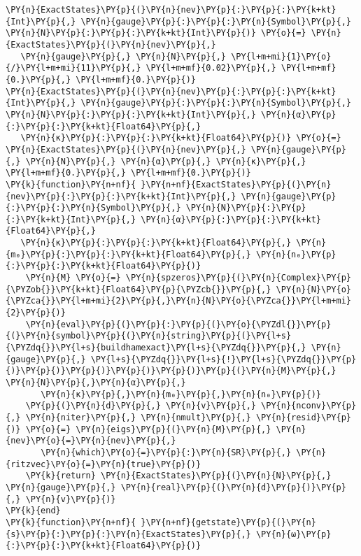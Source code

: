 \begin{Verbatim}[commandchars=\\\{\}]
\PY{n}{ExactStates}\PY{p}{(}\PY{n}{nev}\PY{p}{:}\PY{p}{:}\PY{k+kt}{Int}\PY{p}{,} \PY{n}{gauge}\PY{p}{:}\PY{p}{:}\PY{n}{Symbol}\PY{p}{,} \PY{n}{N}\PY{p}{:}\PY{p}{:}\PY{k+kt}{Int}\PY{p}{)} \PY{o}{=} \PY{n}{ExactStates}\PY{p}{(}\PY{n}{nev}\PY{p}{,}
   \PY{n}{gauge}\PY{p}{,} \PY{n}{N}\PY{p}{,} \PY{l+m+mi}{1}\PY{o}{/}\PY{l+m+mi}{11}\PY{p}{,} \PY{l+m+mf}{0.02}\PY{p}{,} \PY{l+m+mf}{0.}\PY{p}{,} \PY{l+m+mf}{0.}\PY{p}{)}
\PY{n}{ExactStates}\PY{p}{(}\PY{n}{nev}\PY{p}{:}\PY{p}{:}\PY{k+kt}{Int}\PY{p}{,} \PY{n}{gauge}\PY{p}{:}\PY{p}{:}\PY{n}{Symbol}\PY{p}{,} \PY{n}{N}\PY{p}{:}\PY{p}{:}\PY{k+kt}{Int}\PY{p}{,} \PY{n}{α}\PY{p}{:}\PY{p}{:}\PY{k+kt}{Float64}\PY{p}{,}
   \PY{n}{κ}\PY{p}{:}\PY{p}{:}\PY{k+kt}{Float64}\PY{p}{)} \PY{o}{=} \PY{n}{ExactStates}\PY{p}{(}\PY{n}{nev}\PY{p}{,} \PY{n}{gauge}\PY{p}{,} \PY{n}{N}\PY{p}{,} \PY{n}{α}\PY{p}{,} \PY{n}{κ}\PY{p}{,} \PY{l+m+mf}{0.}\PY{p}{,} \PY{l+m+mf}{0.}\PY{p}{)}
\PY{k}{function}\PY{n+nf}{ }\PY{n+nf}{ExactStates}\PY{p}{(}\PY{n}{nev}\PY{p}{:}\PY{p}{:}\PY{k+kt}{Int}\PY{p}{,} \PY{n}{gauge}\PY{p}{:}\PY{p}{:}\PY{n}{Symbol}\PY{p}{,} \PY{n}{N}\PY{p}{:}\PY{p}{:}\PY{k+kt}{Int}\PY{p}{,} \PY{n}{α}\PY{p}{:}\PY{p}{:}\PY{k+kt}{Float64}\PY{p}{,}
   \PY{n}{κ}\PY{p}{:}\PY{p}{:}\PY{k+kt}{Float64}\PY{p}{,} \PY{n}{m₀}\PY{p}{:}\PY{p}{:}\PY{k+kt}{Float64}\PY{p}{,} \PY{n}{n₀}\PY{p}{:}\PY{p}{:}\PY{k+kt}{Float64}\PY{p}{)}
    \PY{n}{M} \PY{o}{=} \PY{n}{spzeros}\PY{p}{(}\PY{n}{Complex}\PY{p}{\PYZob{}}\PY{k+kt}{Float64}\PY{p}{\PYZcb{}}\PY{p}{,} \PY{n}{N}\PY{o}{\PYZca{}}\PY{l+m+mi}{2}\PY{p}{,}\PY{n}{N}\PY{o}{\PYZca{}}\PY{l+m+mi}{2}\PY{p}{)}
    \PY{n}{eval}\PY{p}{(}\PY{p}{:}\PY{p}{(}\PY{o}{\PYZdl{}}\PY{p}{(}\PY{n}{symbol}\PY{p}{(}\PY{n}{string}\PY{p}{(}\PY{l+s}{\PYZdq{}}\PY{l+s}{buildhamexact}\PY{l+s}{\PYZdq{}}\PY{p}{,} \PY{n}{gauge}\PY{p}{,} \PY{l+s}{\PYZdq{}}\PY{l+s}{!}\PY{l+s}{\PYZdq{}}\PY{p}{)}\PY{p}{)}\PY{p}{)}\PY{p}{)}\PY{p}{)}\PY{p}{(}\PY{n}{M}\PY{p}{,} \PY{n}{N}\PY{p}{,}\PY{n}{α}\PY{p}{,}
       \PY{n}{κ}\PY{p}{,}\PY{n}{m₀}\PY{p}{,}\PY{n}{n₀}\PY{p}{)}
    \PY{p}{(}\PY{n}{d}\PY{p}{,} \PY{n}{v}\PY{p}{,} \PY{n}{nconv}\PY{p}{,} \PY{n}{niter}\PY{p}{,} \PY{n}{nmult}\PY{p}{,} \PY{n}{resid}\PY{p}{)} \PY{o}{=} \PY{n}{eigs}\PY{p}{(}\PY{n}{M}\PY{p}{,} \PY{n}{nev}\PY{o}{=}\PY{n}{nev}\PY{p}{,}
       \PY{n}{which}\PY{o}{=}\PY{p}{:}\PY{n}{SR}\PY{p}{,} \PY{n}{ritzvec}\PY{o}{=}\PY{n}{true}\PY{p}{)}
    \PY{k}{return} \PY{n}{ExactStates}\PY{p}{(}\PY{n}{N}\PY{p}{,} \PY{n}{gauge}\PY{p}{,} \PY{n}{real}\PY{p}{(}\PY{n}{d}\PY{p}{)}\PY{p}{,} \PY{n}{v}\PY{p}{)}
\PY{k}{end}
\PY{k}{function}\PY{n+nf}{ }\PY{n+nf}{getstate}\PY{p}{(}\PY{n}{s}\PY{p}{:}\PY{p}{:}\PY{n}{ExactStates}\PY{p}{,} \PY{n}{ω}\PY{p}{:}\PY{p}{:}\PY{k+kt}{Float64}\PY{p}{)}

\end{Verbatim}
